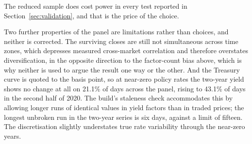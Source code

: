 The reduced sample does cost power in every test reported in
Section~\ref{sec:validation}, and that is the price of the choice.

Two further properties of the panel are limitations rather than choices, and
neither is corrected. The surviving closes are still not simultaneous across
time zones, which depresses measured cross-market correlation and therefore
overstates diversification, in the opposite direction to the factor-count
bias above, which is why neither is used to argue the result one way or the
other. And the Treasury curve is quoted to the basis point, so at near-zero
policy rates the two-year yield shows no change at all on 21.1\% of days across
the panel, rising to 43.1\% of days in the second half of 2020. The build's
staleness check accommodates this by allowing longer runs of identical values
in yield factors than in traded prices; the longest unbroken run in the
two-year series is six days, against a limit of fifteen. The discretisation
slightly understates true rate variability through the near-zero years.

